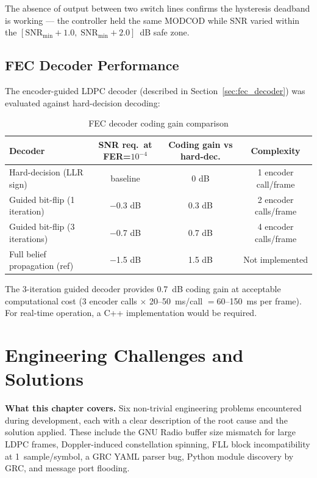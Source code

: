 \documentclass[12pt,a4paper]{report}
\begin{document}
The absence of output between two switch lines confirms the hysteresis
deadband is working — the controller held the same MODCOD while SNR varied
within the $[\text{SNR}_\text{min} + 1.0,\;\text{SNR}_\text{min} + 2.0]$~dB
safe zone.

\section{FEC Decoder Performance}

The encoder-guided LDPC decoder (described in Section~\ref{sec:fec_decoder})
was evaluated against hard-decision decoding:

\begin{table}[H]
\centering
\caption{FEC decoder coding gain comparison}
\label{tab:fec_perf}
\begin{tabular}{lccc}
\toprule
\textbf{Decoder}              & \textbf{SNR req.\ at FER=$10^{-4}$} &
\textbf{Coding gain vs hard-dec.} & \textbf{Complexity} \\
\midrule
Hard-decision (LLR sign)      & baseline  & 0 dB    & 1 encoder call/frame \\
Guided bit-flip (1 iteration) & $-$0.3 dB & 0.3 dB  & 2 encoder calls/frame \\
Guided bit-flip (3 iterations)& $-$0.7 dB & 0.7 dB  & 4 encoder calls/frame \\
Full belief propagation (ref) & $-$1.5 dB & 1.5 dB  & Not implemented \\
\bottomrule
\end{tabular}
\end{table}

The 3-iteration guided decoder provides 0.7~dB coding gain at acceptable
computational cost (3 encoder calls $\times$ 20--50~ms/call $= 60$--150~ms
per frame). For real-time operation, a C++ implementation would be required.

\chapter{Engineering Challenges and Solutions}

\begin{keyinsight}
\textbf{What this chapter covers.}
Six non-trivial engineering problems encountered during development, each with a
clear description of the root cause and the solution applied.  These include
the GNU Radio buffer size mismatch for large LDPC frames, Doppler-induced
constellation spinning, FLL block incompatibility at 1~sample/symbol, a GRC
YAML parser bug, Python module discovery by GRC, and message port flooding.
\end{keyinsight}
\end{document}
